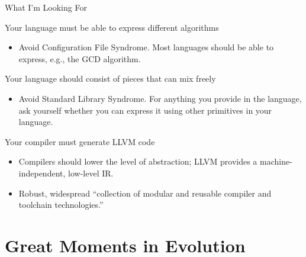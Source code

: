 \documentclass{plt}
\begin{document}
\begin{frame}{What I'm Looking For}

Your language must be able to express different algorithms
\begin{itemize}
\item Avoid Configuration File Syndrome.  Most languages should be
  able to express, e.g., the GCD algorithm.
\end{itemize}

Your language should consist of pieces that can mix freely

\begin{itemize}
\item Avoid Standard Library Syndrome.  For anything you provide in
  the language, ask yourself whether you can express it using other
  primitives in your language.
\end{itemize}

Your compiler must generate LLVM code

\begin{itemize}
\item Compilers should lower the level of abstraction; LLVM provides a
  machine-independent, low-level IR.
  
\item Robust, widespread ``collection of modular and reusable
compiler and toolchain technologies.''
\end{itemize}

\end{frame}


\part{Great Moments in Evolution}
\end{document}
